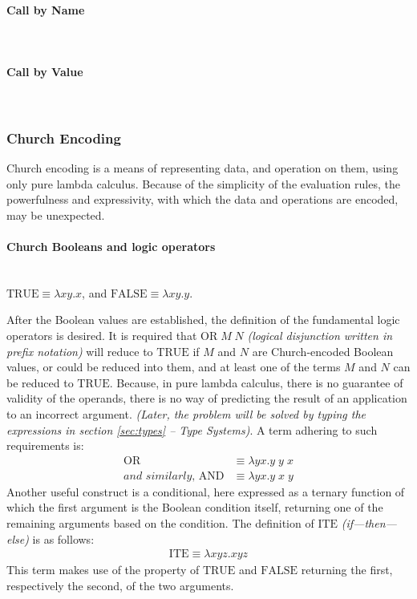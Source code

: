 \documentclass[a4paper,10pt]{article}
\begin{document}
\paragraph{Call by Name}~\\
\paragraph{Call by Value}~\\

\subsubsection{Church Encoding}
Church encoding is a means of representing data, and operation on them, using
only pure lambda calculus. Because of the simplicity of the evaluation rules, the powerfulness
and expressivity, with which the data and operations are encoded, may be unexpected.

\paragraph{Church Booleans and logic operators}~\\

$\mathrm{TRUE} \equiv \lambda xy.x$, and $\mathrm{FALSE} \equiv \lambda xy.y$.

After the Boolean values are established, the definition of the fundamental
logic operators is desired. It is required that $\mathrm{OR}\;M\;N$ 
\textit{(logical disjunction written in prefix notation)} will
reduce to $\mathrm{TRUE}$ if $M$ and $N$ are Church-encoded Boolean values,
or could be reduced into them,
and at least one of the terms $M$ and $N$ can be reduced to $\mathrm{TRUE}$.
Because, in pure lambda calculus, there is no guarantee of validity of
the operands, there is no way of predicting the result of an application to
an incorrect argument. \textit{(Later, the problem will be solved by typing
the expressions in section \ref{sec:types} -- Type Systems)}. A term adhering to
such requirements is:
\begin{align*}
	\mathrm{OR} &\equiv \lambda y x. y\;y\;x\\
	\textit{and similarly, }\mathrm{AND} &\equiv \lambda y x. y\;x\;y
\end{align*}
Another useful construct is a conditional, here expressed as a ternary function
of which the first argument is the Boolean condition itself, returning one
of the remaining arguments based on the condition. The definition of
$\mathrm{ITE}$ \textit{(if---then---else)} is as follows:
\begin{align*}
	\mathrm{ITE} \equiv \lambda xyz.xyz
\end{align*}
This term makes use of the property of $\mathrm{TRUE}$ and $\mathrm{FALSE}$
returning the first, respectively the second, of the two arguments.
\end{document}
